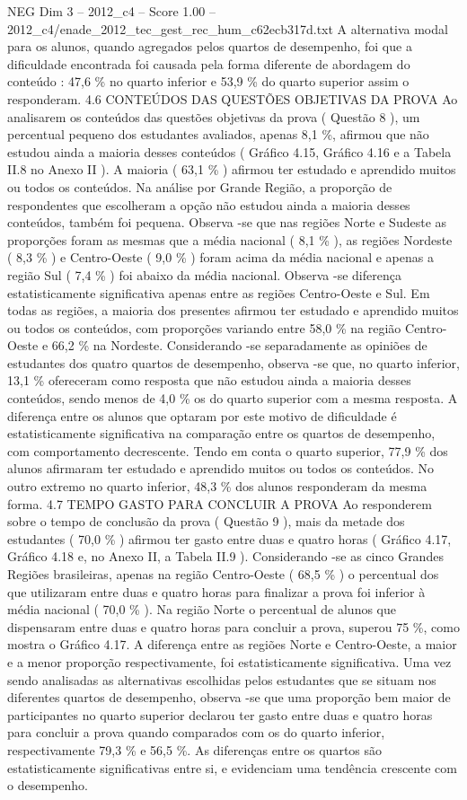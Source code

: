 \begin{textsample}{NEG Dim 3 – 2012\_c4 – Score 1.00 – 2012\_c4/enade\_2012\_tec\_gest\_rec\_hum\_c62ecb317d.txt}
A alternativa modal para os alunos, quando agregados pelos quartos de desempenho, foi que a dificuldade encontrada foi causada pela forma diferente de abordagem do conteúdo : 47,6 \% no quarto inferior e 53,9 \% do quarto superior assim o responderam. 4.6 CONTEÚDOS DAS QUESTÕES OBJETIVAS DA PROVA Ao analisarem os conteúdos das questões objetivas da prova ( Questão 8 ), um percentual pequeno dos estudantes avaliados, apenas 8,1 \%, afirmou que não estudou ainda a maioria desses conteúdos ( Gráfico 4.15, Gráfico 4.16 e a Tabela II.8 no Anexo II ).
A maioria ( 63,1 \% ) afirmou ter estudado e aprendido muitos ou todos os conteúdos.
Na análise por Grande Região, a proporção de respondentes que escolheram a opção não estudou ainda a maioria desses conteúdos, também foi pequena.
Observa -se que nas regiões Norte e Sudeste as proporções foram as mesmas que a média nacional ( 8,1 \% ), as regiões Nordeste ( 8,3 \% ) e Centro-Oeste ( 9,0 \% ) foram acima da média nacional e apenas a região Sul ( 7,4 \% ) foi abaixo da média nacional.
Observa -se diferença estatisticamente significativa apenas entre as regiões Centro-Oeste e Sul.
Em todas as regiões, a maioria dos presentes afirmou ter estudado e aprendido muitos ou todos os conteúdos, com proporções variando entre 58,0 \% na região Centro-Oeste e 66,2 \% na Nordeste.
Considerando -se separadamente as opiniões de estudantes dos quatro quartos de desempenho, observa -se que, no quarto inferior, 13,1 \% ofereceram como resposta que não estudou ainda a maioria desses conteúdos, sendo menos de 4,0 \% os do quarto superior com a mesma resposta.
A diferença entre os alunos que optaram por este motivo de dificuldade é estatisticamente significativa na comparação entre os quartos de desempenho, com comportamento decrescente.
Tendo em conta o quarto superior, 77,9 \% dos alunos afirmaram ter estudado e aprendido muitos ou todos os conteúdos.
No outro extremo no quarto inferior, 48,3 \% dos alunos responderam da mesma forma. 4.7 TEMPO GASTO PARA CONCLUIR A PROVA Ao responderem sobre o tempo de conclusão da prova ( Questão 9 ), mais da metade dos estudantes ( 70,0 \% ) afirmou ter gasto entre duas e quatro horas ( Gráfico 4.17, Gráfico 4.18 e, no Anexo II, a Tabela II.9 ).
Considerando -se as cinco Grandes Regiões brasileiras, apenas na região Centro-Oeste ( 68,5 \% ) o percentual dos que utilizaram entre duas e quatro horas para finalizar a prova foi inferior à média nacional ( 70,0 \% ).
Na região Norte o percentual de alunos que dispensaram entre duas e quatro horas para concluir a prova, superou 75 \%, como mostra o Gráfico 4.17.
A diferença entre as regiões Norte e Centro-Oeste, a maior e a menor proporção respectivamente, foi estatisticamente significativa.
Uma vez sendo analisadas as alternativas escolhidas pelos estudantes que se situam nos diferentes quartos de desempenho, observa -se que uma proporção bem maior de participantes no quarto superior declarou ter gasto entre duas e quatro horas para concluir a prova quando comparados com os do quarto inferior, respectivamente 79,3 \% e 56,5 \%.
As diferenças entre os quartos são estatisticamente significativas entre si, e evidenciam uma tendência crescente com o desempenho.


\end{textsample}
